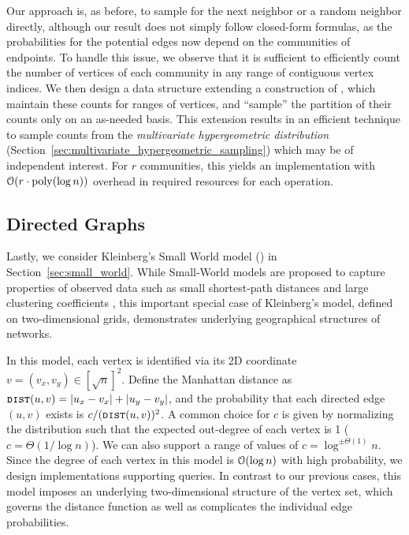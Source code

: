 Our approach is, as before, to sample for the next neighbor or a random neighbor directly,
although our result does not simply follow closed-form formulas,
as the probabilities for the potential edges now depend on the communities of endpoints.
To handle this issue, we observe that it is sufficient to efficiently count
the number of vertices of each community in any range of contiguous vertex indices.
We then design a data structure extending a construction of \cite{huge}, which maintain these counts for ranges of vertices,
and ``sample'' the partition of their counts only on an as-needed basis.
This extension results in an efficient technique to sample counts from the \emph{multivariate hypergeometric distribution}
(Section~\ref{sec:multivariate_hypergeometric_sampling}) which may be of independent interest.
For $r$ communities, this yields an implementation with $ \mathcal{O}(r\cdot \mathrm{poly}(\log n))$ overhead in required resources for each operation.




\subsection{Directed Graphs}
\label{sec:directed_graphs}
Lastly, we consider Kleinberg's Small World model (\cite{kleinberg, klein}) in Section~\ref{sec:small_world}.
While Small-World models are proposed to capture properties of observed data such as small shortest-path 
distances and large clustering coefficients \cite{watts1998collective}, 
this important special case of Kleinberg's model, defined on two-dimensional grids, demonstrates underlying geographical structures of networks.

In this model, each vertex is identified via its 2D coordinate $v = (v_x, v_y) \in [\sqrt{n}]^2$.
Define the Manhattan distance as $\texttt{\textsc{dist}}(u,v)=|u_x-v_x|+|u_y-v_y|$,
and the probability that each directed edge $(u,v)$ exists is $c/(\texttt{\textsc{dist}}(u,v))^{2}$.
A common choice for $c$ is given by normalizing the distribution such that the expected out-degree of each vertex is 1 ($c = \Theta(1/\log n)$).
We can also support a range of values of $c=\log^{\pm\Theta(1)}n$.
Since the degree of each vertex in this model is $\Bo(\log n)$ with high probability, we design implementations supporting  queries.
In contrast to our previous cases, this model imposes an underlying two-dimensional structure of the vertex set,
which governs the distance function as well as complicates the individual edge probabilities.

